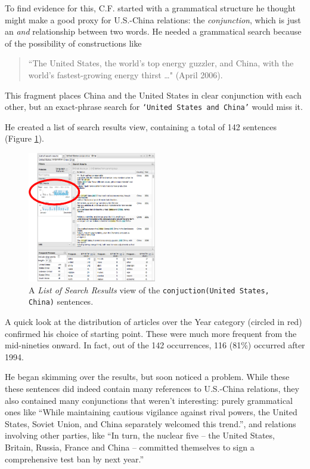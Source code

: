 \documentclass{sig-alternate}
\newcommand{\code}[1] {\texttt{#1}}
\begin{document}
To find evidence for this, C.F.  started with a grammatical structure he thought might make a good proxy for U.S.-China relations: the \emph{conjunction}, which is just an \emph{and} relationship between two words.  He needed a grammatical search because of the possibility of constructions like 
\begin{quote}
``The United States, the world's top energy guzzler, and China, with the world's fastest-growing energy thirst \ldots" (April 2006).
\end{quote}
This fragment places China and the United States in clear conjunction with each other, but an exact-phrase search for \code{`United States and China'} would miss it. 

He created a list of search results view, containing a total of 142 sentences (Figure \ref{fig:chris05}).
\begin{figure}[h!]
\includegraphics[width=0.5\textwidth]{fig/chris/05-circled.png}
\caption{ A \emph{List of Search Results} view of the \code{conjuction(United States, China)} sentences. \label{fig:chris05}}
\end{figure}
A quick look at the distribution of articles over the Year category (circled in red) confirmed his choice of starting point. These were much more frequent from the mid-nineties onward. In fact, out of the 142 occurrences, 116 (81\%) occurred after 1994.

He began skimming over the results, but soon noticed a problem. While these these sentences did indeed contain many references to U.S.-China relations, they also contained many conjunctions that weren't interesting: purely grammatical ones like ``While maintaining cautious vigilance against rival powers, the United States, Soviet Union, and China separately welcomed this trend.'', and relations involving other parties, like ``In turn, the nuclear five -- the United States, Britain, Russia, France and China -- committed themselves to sign a comprehensive test ban by next year.''
\end{document}
